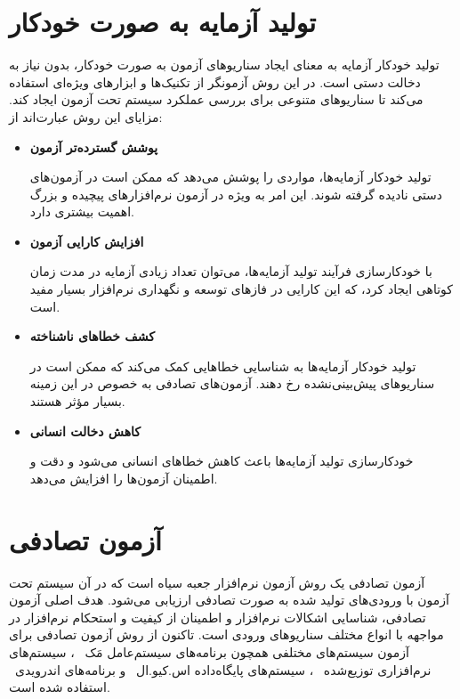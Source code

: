 \section{تولید آزمایه به صورت خودکار}
تولید خودکار آزمایه 
به معنای ایجاد سناریوهای آزمون به صورت خودکار، بدون نیاز به دخالت دستی است. در این روش آزمونگر از تکنیک‌ها و ابزارهای ویژه‌ای استفاده می‌کند تا سناریوهای متنوعی برای بررسی عملکرد سیستم تحت آزمون
 ایجاد کند. مزایای این روش عبارت‌اند از:
\begin{itemize}
	\item \textbf{پوشش گسترده‌تر آزمون}
	
	 تولید خودکار آزمایه‌ها، مواردی را پوشش می‌دهد که ممکن است در آزمون‌های دستی نادیده گرفته شوند. این امر به ویژه در آزمون نرم‌افزارهای پیچیده و بزرگ اهمیت بیشتری دارد.
	\item \textbf{افزایش کارایی آزمون}
	
	 با خودکارسازی فرآیند تولید آزمایه‌ها، می‌توان تعداد زیادی آزمایه در مدت زمان کوتاهی ایجاد کرد، که این کارایی در فازهای توسعه و نگهداری نرم‌افزار بسیار مفید است.
	\item \textbf{کشف خطاهای ناشناخته}
	
	 تولید خودکار آزمایه‌ها به شناسایی خطاهایی کمک می‌کند که ممکن است در سناریوهای پیش‌بینی‌نشده رخ دهند. آزمون‌های تصادفی به خصوص در این زمینه بسیار مؤثر هستند.
	\item \textbf{کاهش دخالت انسانی}
	
	 خودکارسازی تولید آزمایه‌ها باعث کاهش خطاهای انسانی می‌شود و دقت و اطمینان آزمون‌ها را افزایش می‌دهد.
\end{itemize}

\section{آزمون تصادفی}
آزمون تصادفی
\cite{hamlet1994random}
 یک روش آزمون نرم‌افزار جعبه سیاه
\cite{nidhra2012black}
  است که در آن سیستم تحت آزمون با ورودی‌های تولید شده به صورت تصادفی ارزیابی می‌شود. هدف اصلی آزمون تصادفی، شناسایی اشکالات نرم‌افزار و اطمینان از کیفیت و استحکام نرم‌افزار در مواجهه با انواع مختلف سناریوهای ورودی است. تاکنون از روش آزمون تصادفی برای آزمون سیستم‌های مختلفی همچون برنامه‌های سیستم‌عامل مَک~\cite{miller2006empirical}
 ، سیستم‌های نرم‌افزاری توزیع‌شده~\cite{regehr2005random}
  ، سیستم‌های پایگاه‌داده اس‌.کیو.ال~\cite{bati2007genetic}
  و برنامه‌های اندرویدی~\cite{muangsiri2017random}
استفاده شده است.
